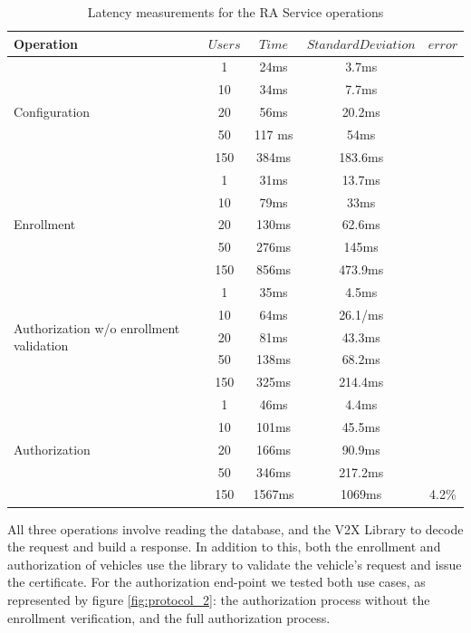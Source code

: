  \begin{table}[!htb]
 	\renewcommand{\arraystretch}{1.6} %
 	\centering
 	\begin{tabular}{lcccc}
 		\toprule
 		 Operation & $Users$  & $Time$ & $StandardDeviation$ & $ error$$$\\
 		\midrule
 		\multirow{5}{6em}{Configuration}& 1 & 24ms & 3.7ms   \\
 		& 10 & 34ms & 7.7ms     \\
 		& 20& 56ms & 20.2ms     \\
 		& 50& 117 ms& 54ms     \\
 		& 150& 384ms& 183.6ms     \\
 		\hline
 		\multirow{5}{6em}{Enrollment} &1 & 31ms & 13.7ms   \\
 		&10 & 79ms & 33ms     \\
 		&20& 130ms & 62.6ms     \\
 		&50& 276ms & 145ms     \\
 		&150& 856ms & 473.9ms     \\
 		\hline
 		\multirow{5}{6em}{Authorization w/o enrollment validation} &1 & 35ms & 4.5ms   \\
 		&10 & 64ms & 26.1/ms     \\
 		&20& 81ms & 43.3ms     \\
 		&50& 138ms & 68.2ms     \\
 		&150& 325ms & 214.4ms     \\
 			\hline
 		\multirow{5}{6em}{Authorization} &1 & 46ms& 4.4ms   \\
 		&10 & 101ms & 45.5ms     \\
 		&20& 166ms & 90.9ms     \\
 		&50& 346ms & 217.2ms     \\
 		&150& 1567ms & 1069ms & 4.2\%    \\
 		\bottomrule
 		\end{tabular}
 	\caption[time]{Latency measurements for the RA Service operations}
 \label{tab:table2}
\end{table}
 			
\newpage 	
 			
All three operations involve reading the database, and the V2X Library to decode the request and build a response. In addition to this, both the enrollment and authorization of vehicles use the library to validate the vehicle's request and issue the certificate. For the authorization end-point we tested both use cases, as represented by figure \ref{fig:protocol_2}: the authorization process without the enrollment verification, and the full authorization process.

